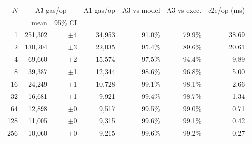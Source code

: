 \begin{tabular}{rrrrrrr}
\toprule
$N$ & \multicolumn{2}{c}{A3 gas/op} & A1 gas/op & A3 vs model & A3 vs exec. & e2e/op (ms) \\
 & mean & 95\% CI & & & & \\
\midrule
1 & 251{,}302 & $\pm$4 & 34{,}953 & 91.0\% & 79.9\% & 38.69 \\
2 & 130{,}204 & $\pm$3 & 22{,}035 & 95.4\% & 89.6\% & 20.61 \\
4 & 69{,}660 & $\pm$2 & 15{,}574 & 97.5\% & 94.4\% & 9.89 \\
8 & 39{,}387 & $\pm$1 & 12{,}344 & 98.6\% & 96.8\% & 5.00 \\
16 & 24{,}249 & $\pm$1 & 10{,}728 & 99.1\% & 98.1\% & 2.66 \\
32 & 16{,}681 & $\pm$1 & 9{,}921 & 99.4\% & 98.7\% & 1.34 \\
64 & 12{,}898 & $\pm$0 & 9{,}517 & 99.5\% & 99.0\% & 0.71 \\
128 & 11{,}005 & $\pm$0 & 9{,}315 & 99.6\% & 99.1\% & 0.42 \\
256 & 10{,}060 & $\pm$0 & 9{,}215 & 99.6\% & 99.2\% & 0.27 \\
\bottomrule
\end{tabular}
